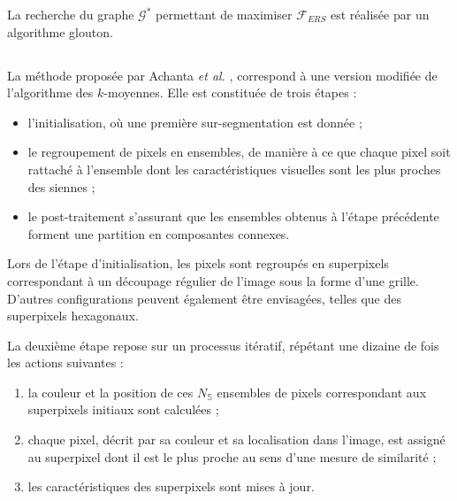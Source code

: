 La recherche du graphe $\mathcal{G}^{*}$ permettant de maximiser $\mathcal{F}_{ERS}$ est réalisée par un algorithme glouton. 

\subsection{}
\label{subsec:sp:slic}

La méthode  proposée par Achanta \textit{et al.} \cite{achanta2012slic}, correspond à une version modifiée de l'algorithme des $k$-moyennes. Elle est constituée de trois étapes : 
\begin{itemize}
\item l'initialisation, où une première sur-segmentation est donnée ;
\item le regroupement de pixels en ensembles, de manière à ce que chaque pixel soit rattaché à l'ensemble dont les caractéristiques visuelles sont les plus proches des siennes ;
\item le post-traitement s'assurant que les ensembles obtenus à l'étape précédente forment une partition en composantes connexes. 
\end{itemize}

Lors de l'étape d'initialisation, les pixels sont regroupés en superpixels correspondant à un découpage régulier de l'image sous la forme d'une grille. D'autres configurations peuvent également être envisagées, telles que des superpixels hexagonaux. 

La deuxième étape repose sur un processus itératif, répétant une dizaine de fois les actions suivantes :
\begin{enumerate}
\item  la couleur et la position  de ces $N_{\mathbb{S}}$ ensembles de pixels correspondant aux superpixels initiaux sont calculées ;
\item chaque pixel, décrit par sa couleur et sa localisation dans l'image, est assigné au superpixel dont il est le plus proche au sens d'une mesure de similarité ;
\item les caractéristiques des superpixels sont mises à jour.
\end{enumerate}

